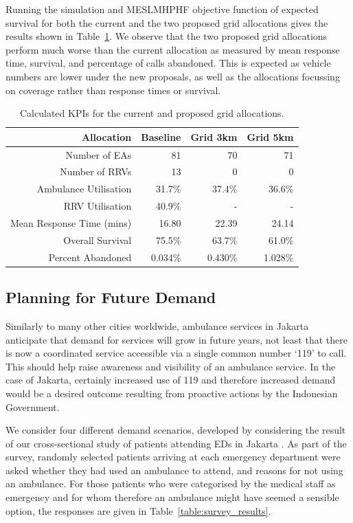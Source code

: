 \documentclass[preprint,12pt]{elsarticle}
\begin{document}
Running the simulation and MESLMHPHF objective function of expected survival for
both the current and the two proposed grid allocations gives the results shown
in Table~\ref{tbl:current_grid_results}. We observe that the two proposed
grid allocations perform much worse than the current allocation as measured by
mean response time, survival, and percentage of calls abandoned.
This is expected as vehicle numbers are lower under the new proposals, as well
as the allocations focussing on coverage rather than response times or survival.

\begin{table}
\begin{center}
\begin{tabular}{rrrr}
\toprule
Allocation & Baseline & Grid 3km & Grid 5km \\
\midrule
Number of EAs & 81 & 70 & 71 \\
Number of RRVs & 13 & 0 & 0 \\
Ambulance Utilisation & 31.7\% & 37.4\% & 36.6\% \\
RRV Utilisation & 40.9\% & - & - \\
Mean Response Time (mins) & 16.80 & 22.39 & 24.14 \\
Overall Survival & 75.5\% & 63.7\% & 61.0\% \\
Percent Abandoned & 0.034\% & 0.430\% & 1.028\% \\
\bottomrule
\end{tabular}
\caption{Calculated KPIs for the current and proposed grid allocations.}
\label{tbl:current_grid_results}
\end{center}
\end{table}


\subsection{Planning for Future Demand}\label{sec:demand_scenarios}
Similarly to many other cities worldwide, ambulance services in Jakarta
anticipate that demand for services will grow in future years, not least that
there is now a coordinated service accessible via a single common number `119'
to call. This should help raise awareness and visibility of an ambulance
service. In the case of Jakarta, certainly increased use of 119 and therefore
increased demand would be a desired outcome resulting from proactive actions
by the Indonesian Government. 

We consider four different demand scenarios, developed by considering the
result of our cross-sectional study of patients attending EDs in Jakarta
\cite{BriceSyaribahNoor2022Esui}. As part of the survey, randomly selected
patients arriving at each emergency department were asked whether they had
used an ambulance to attend, and reasons for not using an ambulance. For those
patients who were categorised by the medical staff as emergency and for whom
therefore an ambulance might have seemed a sensible option, the responses are
given in Table~\ref{table:survey_results}.
\end{document}
